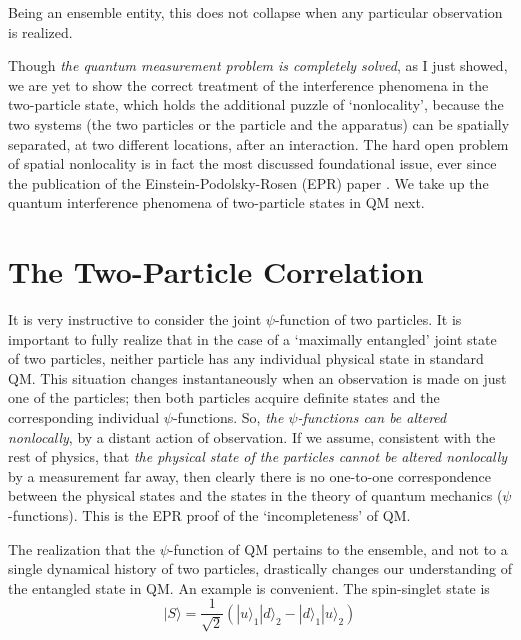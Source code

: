 Being an ensemble entity, this does not collapse when any particular observation is realized.

Though \textit{the quantum measurement problem is completely solved}, as I just showed, we are
yet to show the correct treatment of the interference phenomena in the two-particle state,
which holds the additional puzzle of `nonlocality', because the two systems (the two particles
or the particle and the apparatus) can be spatially separated, at two different locations, after
an interaction. The hard open problem of spatial nonlocality is in fact the most discussed
foundational issue, ever since the publication of the Einstein-Podolsky-Rosen (EPR) paper
\cite{chap14-key9}. We take up the quantum interference phenomena of two-particle states in QM next.
\newpage

\section{The Two-Particle Correlation}\label{c14-sec7}

It is very instructive to consider the joint $\psi$-function of two particles. It is important
to fully realize that in the case of a `maximally entangled' joint state of two particles,
neither particle has any individual physical state in standard QM. This situation changes
instantaneously when an observation is made on just one of the particles; then both particles
acquire definite states and the corresponding individual $\psi$-functions. So, \textit{the $\psi$-functions
can be altered nonlocally}, by a distant action of observation. If we assume, consistent with
the rest of physics, that \textit{the physical state of the particles cannot be altered nonlocally} by
a measurement far away, then clearly there is no one-to-one correspondence between the
physical states and the states in the theory of quantum mechanics ($\psi$-functions). This is
the EPR proof of the `incompleteness' of QM.

The realization that the $\psi$-function of QM pertains to the ensemble, and not to a single dynamical history of two
particles, drastically changes our understanding of the entangled state in QM. An example
is convenient. The spin-singlet state is
\begin{equation*}
|S\rangle = \frac{1}{\sqrt{2}} (|u \rangle_1 | d \rangle_2 - | d \rangle_1 |u\rangle_2) \tag{32}\label{c14-eq32}
\end{equation*}

